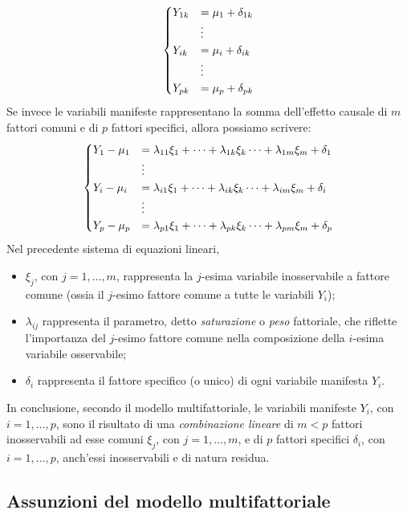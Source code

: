 \begin{equation}
\begin{cases} 
  Y_{1k}    &= \mu_1 + \delta_{1k} \\
&\vdots\\
Y_{ik}   &= \mu_i + \delta_{ik}\\
&\vdots\\
Y_{pk}   &= \mu_p + \delta_{pk} \notag
\end{cases}
\end{equation} 
Se invece le variabili manifeste rappresentano la somma dell'effetto causale di $m$ fattori comuni e di $p$ fattori specifici, allora possiamo scrivere:
\begin{equation}
\begin{cases} 
  Y_1  - \mu_1  &= \lambda_{11}\xi_1 + \dots + \lambda_{1k}\xi_k \dots +\lambda_{1m}\xi_m + \delta_1 \\
&\vdots\\
Y_i -  \mu_i  &= \lambda_{i1}\xi_1 + \dots +  \lambda_{ik}\xi_k \dots +\lambda_{im}\xi_m + \delta_i\\
&\vdots\\
Y_p - \mu_p  &= \lambda_{p1}\xi_1 + \dots +  \lambda_{pk}\xi_k \dots +\lambda_{pm}\xi_m + \delta_p \notag
\end{cases}
\end{equation}
Nel precedente sistema di equazioni lineari, 
\begin{itemize}
\item 
  $\xi_j$, con $j=1, \dots, m$, rappresenta la $j$-esima variabile inosservabile a fattore comune (ossia il $j$-esimo fattore comune a tutte le variabili $Y_i$);
\item 
  $\lambda_{ij}$ rappresenta il parametro, detto \emph{saturazione} o \emph{peso} fattoriale, che riflette l'importanza del $j$-esimo fattore comune nella composizione della $i$-esima variabile osservabile;
\item 
  $\delta_i$ rappresenta il fattore specifico (o unico) di ogni variabile manifesta $Y_i$.
\end{itemize}

In conclusione, secondo il modello multifattoriale, le variabili manifeste $Y_i$, con $i=1, \dots, p$, sono il risultato di una \emph{combinazione lineare} di $m < p$ fattori inosservabili ad esse comuni $\xi_j$, con $j=1, \dots, m$, e di $p$ fattori specifici $\delta_i$, con $i=1, \dots, p$, anch'essi inosservabili e di natura residua.


\subsection{Assunzioni del modello multifattoriale}

